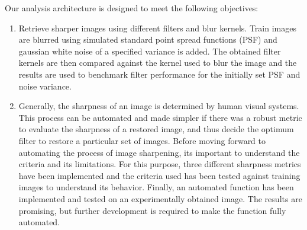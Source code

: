 \noindent Our analysis architecture is designed to meet the following objectives:
\begin{enumerate}
\item  Retrieve sharper images using different filters and blur kernels. Train images are blurred using simulated standard point spread functions (PSF) and gaussian white noise of a specified variance is added. The obtained filter kernels are then compared against the kernel used to blur the image and the results are used to benchmark filter performance for the initially set PSF and noise variance. 
\item Generally, the sharpness of an image is determined by human visual systems. This process can be automated and made simpler if there was a robust metric to evaluate the sharpness of a restored image, and thus decide the optimum filter to restore a particular set of images. Before moving forward to automating the process of image sharpening, its important to understand the criteria and its limitations. For this purpose, three different sharpness metrics have been implemented and the criteria used has been tested against training images to understand its behavior. Finally, an automated function has been implemented and tested on an experimentally obtained image. The results are promising, but further development is required to make the function fully automated.

\end{enumerate}
\newpage